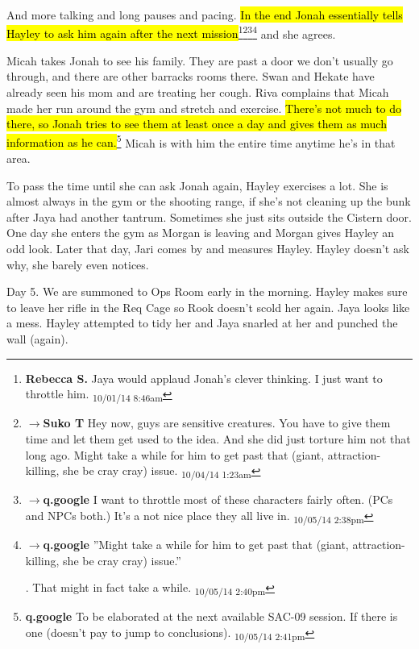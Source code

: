 And more talking and long pauses and pacing.   \hl{In the end Jonah essentially tells Hayley to ask him again after the next mission}\footnote{\textbf{Rebecca S. }Jaya would applaud Jonah's clever thinking.  I just want to throttle him. \textsubscript{10/01/14 8:46am}}\footnote{$\rightarrow$\textbf{Suko T }Hey now, guys are sensitive creatures. You have to give them time and let them get used to the idea.  And she did just torture him not that long ago.  Might take a while for him to get past that (giant, attraction-killing, she be cray cray) issue. \textsubscript{10/04/14 1:23am}}\footnote{$\rightarrow$\textbf{q.google }I want to throttle most of these characters fairly often.  (PCs and NPCs both.)  It's a not nice place they all live in. \textsubscript{10/05/14 2:38pm}}\footnote{$\rightarrow$\textbf{q.google }''Might take a while for him to get past that (giant, attraction-killing, she be cray cray) issue.''

.  That might in fact take a while. \textsubscript{10/05/14 2:40pm}} and she agrees.





Micah takes Jonah to see his family.  They are past a door we don't usually go through, and there are other barracks rooms there.  Swan and Hekate have already seen his mom and are treating her cough.  Riva complains that Micah made her run around the gym and stretch and exercise.  \hl{There's not much to do there, so Jonah tries to see them at least once a day and gives them as much information as he can.}\footnote{\textbf{q.google }To be elaborated at the next available SAC-09 session.  If there is one (doesn't pay to jump to conclusions). \textsubscript{10/05/14 2:41pm}}  Micah is with him the entire time anytime he's in that area.



To pass the time until she can ask Jonah again, Hayley exercises a lot.  She is almost always in the gym or the shooting range, if she's not cleaning up the bunk after Jaya had another tantrum.  Sometimes she just sits outside the Cistern door.  One day she enters the gym as Morgan is leaving and Morgan gives Hayley an odd look.  Later that day, Jari comes by and measures Hayley.  Hayley doesn't ask why, she barely even notices.





Day 5.  We are summoned to Ops Room early in the morning.  Hayley makes sure to leave her rifle in the Req Cage so Rook doesn't scold her again.  Jaya looks like a mess. Hayley attempted to tidy her and Jaya snarled at her and punched the wall (again). 



